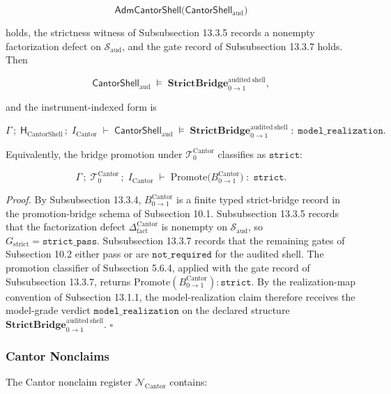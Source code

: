 \documentclass[11pt]{article}
\theoremstyle{definition}
\begin{document}
\[
\mathsf{AdmCantorShell}\bigl(\mathsf{CantorShell}_{\mathrm{aud}}\bigr)
\]

holds, the strictness witness of Subsubsection 13.3.5 records a nonempty factorization defect on \(\mathcal S_{\mathrm{aud}}\), and the gate record of Subsubsection 13.3.7 holds. Then

\[
\mathsf{CantorShell}_{\mathrm{aud}}\;\models\;\mathbf{StrictBridge}_{0\to 1}^{\mathrm{audited\ shell}},
\]

and the instrument-indexed form is

\[
\Gamma\,;\;\mathsf H_{\mathrm{CantorShell}}\,;\;I_{\mathrm{Cantor}}\;\vdash\;\mathsf{CantorShell}_{\mathrm{aud}}\;\models\;\mathbf{StrictBridge}_{0\to 1}^{\mathrm{audited\ shell}}\;:\;\texttt{model\_realization}.
\]

Equivalently, the bridge promotion under \(\mathcal T_0^{\mathrm{Cantor}}\) classifies as \(\texttt{strict}\):

\[
\Gamma\,;\;\mathcal T_0^{\mathrm{Cantor}}\,;\;I_{\mathrm{Cantor}}\;\vdash\;\mathrm{Promote}\bigl(B_{0\to 1}^{\mathrm{Cantor}}\bigr)\;:\;\texttt{strict}.
\]

\emph{Proof.} By Subsubsection 13.3.4, \(B_{0\to 1}^{\mathrm{Cantor}}\) is a finite typed strict-bridge record in the promotion-bridge schema of Subsection 10.1. Subsubsection 13.3.5 records that the factorization defect \(\Delta_{\mathrm{fact}}^{\mathrm{Cantor}}\) is nonempty on \(\mathcal S_{\mathrm{aud}}\), so \(G_{\mathrm{strict}}=\texttt{strict\_pass}\). Subsubsection 13.3.7 records that the remaining gates of Subsection 10.2 either pass or are \(\texttt{not\_required}\) for the audited shell. The promotion classifier of Subsection 5.6.4, applied with the gate record of Subsubsection 13.3.7, returns \(\mathrm{Promote}(B_{0\to 1}^{\mathrm{Cantor}}):\texttt{strict}\). By the realization-map convention of Subsection 13.1.1, the model-realization claim therefore receives the model-grade verdict \(\texttt{model\_realization}\) on the declared structure \(\mathbf{StrictBridge}_{0\to 1}^{\mathrm{audited\ shell}}\). \(\square\)

\subsubsection{Cantor Nonclaims}

The Cantor nonclaim register \(\mathcal N_{\mathrm{Cantor}}\) contains:
\end{document}
